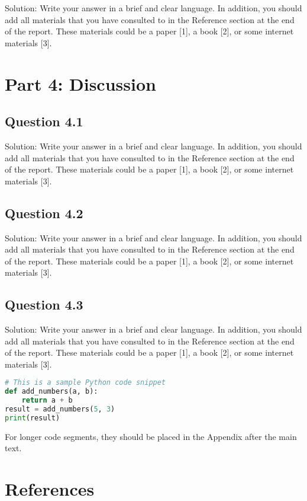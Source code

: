 \documentclass[12pt]{article}
\begin{document}
Solution: Write your answer in a brief and clear language. In addition, you should add all materials that you have consulted to in the Reference section at the end of the report. These materials could be a paper [1], a book [2], or some internet materials [3].

\section{Part 4: Discussion}
\subsection{Question 4.1}
Solution: Write your answer in a brief and clear language. In addition, you should add all materials that you have consulted to in the Reference section at the end of the report. These materials could be a paper [1], a book [2], or some internet materials [3].

\subsection{Question 4.2}
Solution: Write your answer in a brief and clear language. In addition, you should add all materials that you have consulted to in the Reference section at the end of the report. These materials could be a paper [1], a book [2], or some internet materials [3].

\subsection{Question 4.3}
Solution: Write your answer in a brief and clear language. In addition, you should add all materials that you have consulted to in the Reference section at the end of the report. These materials could be a paper [1], a book [2], or some internet materials [3].

\newpage

\begin{center}
\begin{lstlisting}[language=Python]
# This is a sample Python code snippet
def add_numbers(a, b):
    return a + b
result = add_numbers(5, 3)
print(result)
\end{lstlisting}
\end{center}

For longer code segments, they should be placed in the Appendix after the main text.

\section*{References}
\end{document}
